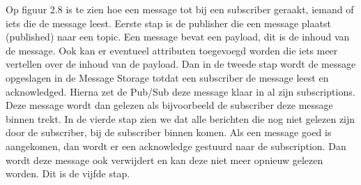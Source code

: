 Op figuur 2.8 is te zien hoe een message tot bij een subscriber geraakt, iemand of iets die de message leest. Eerste stap is de publisher die een message plaatst (published) naar een topic. Een message bevat een payload, dit is de inhoud van de message. Ook kan er eventueel attributen toegevoegd worden die iets meer vertellen over de inhoud van de payload. Dan in de tweede stap wordt de message opgeslagen in de Message Storage totdat een subscriber de message leest en acknowledged. Hierna zet de Pub/Sub deze message klaar in al zijn subscriptions. Deze message wordt dan gelezen als bijvoorbeeld de subscriber deze message binnen trekt. In de vierde stap zien we dat alle berichten die nog niet gelezen zijn door de subscriber, bij de subscriber binnen komen. Als een message goed is aangekomen, dan wordt er een acknowledge gestuurd naar de subscription. Dan wordt deze message ook verwijdert en kan deze niet meer opnieuw gelezen worden. Dit is de vijfde stap.

\autocite{Google2019}





